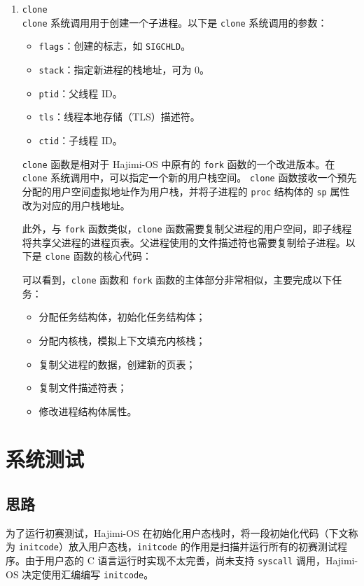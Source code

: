 \documentclass[UTF8]{article}
\begin{document}
\begin{enumerate}
  \item \texttt{clone\\}
        \texttt{clone} 系统调用用于创建一个子进程。以下是 \texttt{clone} 系统调用的参数：

        \begin{itemize}
          \item \texttt{flags}：创建的标志，如 \texttt{SIGCHLD}。
          \item \texttt{stack}：指定新进程的栈地址，可为 0。
          \item \texttt{ptid}：父线程 ID。
          \item \texttt{tls}：线程本地存储（TLS）描述符。
          \item \texttt{ctid}：子线程 ID。
        \end{itemize}

        \texttt{clone} 函数是相对于 Hajimi-OS 中原有的 \texttt{fork} 函数的一个改进版本。在 \texttt{clone} 系统调用中，可以指定一个新的用户栈空间。 \texttt{clone} 函数接收一个预先分配的用户空间虚拟地址作为用户栈，并将子进程的 \texttt{proc} 结构体的 \texttt{sp} 属性改为对应的用户栈地址。

        此外，与 \texttt{fork} 函数类似，\texttt{clone} 函数需要复制父进程的用户空间，即子线程将共享父进程的进程页表。父进程使用的文件描述符也需要复制给子进程。以下是 \texttt{clone} 函数的核心代码：
        
        可以看到，\texttt{clone} 函数和 \texttt{fork} 函数的主体部分非常相似，主要完成以下任务：

        \begin{itemize}
          \item 分配任务结构体，初始化任务结构体；
          \item 分配内核栈，模拟上下文填充内核栈；
          \item 复制父进程的数据，创建新的页表；
          \item 复制文件描述符表；
          \item 修改进程结构体属性。
        \end{itemize}

\end{enumerate}

\section{系统测试}
\subsection{\textbf{思路}}
为了运行初赛测试，Hajimi-OS 在初始化用户态栈时，将一段初始化代码（下文称为 \texttt{initcode}）放入用户态栈，\texttt{initcode} 的作用是扫描并运行所有的初赛测试程序。由于用户态的 C 语言运行时实现不太完善，尚未支持 \texttt{syscall} 调用，Hajimi-OS 决定使用汇编编写 \texttt{initcode}。
\end{document}
